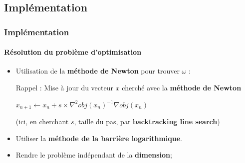 \documentclass{beamer}
\begin{document}
\subsection{Implémentation}

\begin{frame}
\tableofcontents[currentsubsection]
\end{frame}

\begin{frame}
\frametitle{Implémentation}
\framesubtitle{Résolution du problème d'optimisation}

\begin{itemize}
\item Utilisation de la \textbf{méthode de Newton} pour trouver $\omega$ :

\bigskip

\begin{block}{Rappel : Mise à jour du vecteur $x$ cherché avec la \textbf{méthode de Newton}}
          \begin{center}
          $x_{n+1} \leftarrow x_{n} + s \times \nabla^2 obj(x_n)^{-1}\nabla obj(x_n)$
          \end{center}

  (ici, en cherchant $s$, taille du pas, par \textbf{backtracking line search})
\end{block}

\pause

\item Utiliser la \textbf{méthode de la barrière logarithmique}.

\pause

\item Rendre le problème indépendant de la \textbf{dimension};

\end{itemize}

\end{frame}
\end{document}
